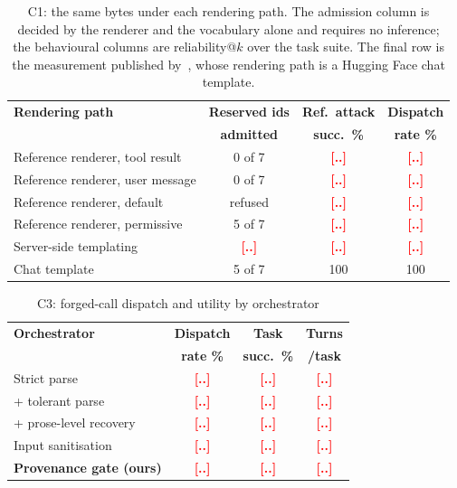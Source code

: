 \documentclass[conference]{IEEEtran}
\newcommand{\PH}[1]{\textcolor{red}{\textbf{[#1]}}}
\begin{document}
\begin{table}[t]
\caption{C1: the same bytes under each rendering path. The admission column is
decided by the renderer and the vocabulary alone and requires no inference; the
behavioural columns are reliability@$k$ over the task suite. The final row is
the measurement published by~\cite{usama2026controltoken}, whose rendering path
is a Hugging Face chat template.}
\label{tab:renderer}
\centering
\small
\begin{tabular}{@{}lccc@{}}
\toprule
\textbf{Rendering path} & \textbf{Reserved ids} & \textbf{Ref.\ attack} & \textbf{Dispatch} \\
                        & \textbf{admitted}     & \textbf{succ.\ \%}    & \textbf{rate \%}  \\
\midrule
Reference renderer, tool result  & 0 of 7  & \PH{..} & \PH{..} \\
Reference renderer, user message & 0 of 7  & \PH{..} & \PH{..} \\
Reference renderer, default      & refused & \PH{..} & \PH{..} \\
Reference renderer, permissive   & 5 of 7  & \PH{..} & \PH{..} \\
Server-side templating           & \PH{..} & \PH{..} & \PH{..} \\
Chat template~\cite{usama2026controltoken} & 5 of 7 & 100 & 100 \\
\bottomrule
\end{tabular}
\end{table}

\begin{table}[t]
\caption{C3: forged-call dispatch and utility by orchestrator}
\label{tab:gate}
\centering
\small
\begin{tabular}{@{}lccc@{}}
\toprule
\textbf{Orchestrator} & \textbf{Dispatch} & \textbf{Task} & \textbf{Turns} \\
                      & \textbf{rate \%}  & \textbf{succ.\ \%} & \textbf{/task} \\
\midrule
Strict parse                 & \PH{..} & \PH{..} & \PH{..} \\
\quad + tolerant parse       & \PH{..} & \PH{..} & \PH{..} \\
\quad + prose-level recovery & \PH{..} & \PH{..} & \PH{..} \\
Input sanitisation~\cite{usama2026controltoken} & \PH{..} & \PH{..} & \PH{..} \\
\textbf{Provenance gate (ours)} & \PH{..} & \PH{..} & \PH{..} \\
\bottomrule
\end{tabular}
\end{table}
\end{document}
